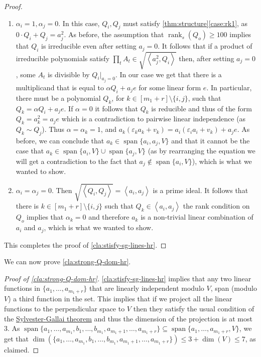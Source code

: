 \documentclass[10pt,a4paper]{article}
\def\rank{\operatorname{rank}}
\newcommand{\ideal}[1]{\left \langle{#1}\right \rangle}
\newcommand{\MVar}[2]{{#1}_1,\ldots, {#1}_{#2}}
\newcommand{\spn}[1]{\operatorname{span}\{{#1}\}}
\def\epsilon{\varepsilon}
\newcommand{\rkq}{100}
\begin{document}
\begin{proof}
\begin{enumerate}[label=(\roman*)]
	\item $\alpha_i= 1, \alpha_j = 0$. In this case, $Q_i,Q_j$ must satisfy \autoref{thm:structure}\ref{case:rk1}, as $0 \cdot Q_i + Q_j = a_j^2$. As before,  the  assumption that $\rank_s(Q_o)\geq \rkq$ implies that $Q_i$ is irreducible even after setting $a_j=0$. It follows that if a product of irreducible polynomials satisfy $\prod_t A_t \in  \sqrt{\ideal{a_j^2,Q_i}}$ then, after setting $a_j=0$, some $A_t$ is divisible by ${Q_i}|_{a_j=0}$. In our case we get that there is a multiplicand that is equal to $ \alpha Q_i + a_je$ for some linear form $e$. In particular, there must be a polynomial $Q_k$, for $k\in[m_1+r]\setminus \{i,j\}$, such that  $Q_k = \alpha Q_i + a_je$.
	If $\alpha = 0$ it follows that $Q_k$ is reducible and thus of the form $Q_k = a_k^2 = a_je$ which is a contradiction to pairwise linear independence (as $Q_k \sim Q_j$).  Thus $\alpha = \alpha_k = 1$, and $a_k(\epsilon_ka_k + v_k) = a_i(\epsilon_i a_i + v_k) + a_je$. As before, we can conclude that $a_k \in \spn{a_i,a_j,V}$ and that it cannot be the case that $a_k \in \spn{a_i,V} \cup \spn{a_j,V}$ (as by rearranging the equation we will get a contradiction to the fact that $a_j \notin \spn{a_i,V}$),  which is what we wanted to show.
	
	

	
	\item  $\alpha_i= \alpha_j = 0$. Then $\sqrt{\ideal{Q_i,Q_j}} = \ideal{a_i,a_j}$ is a prime ideal. It follows that there is $k \in [m_1+r] \setminus \{i,j\}$ such that $Q_k \in \ideal{a_i,a_j}$ the  rank condition on $Q_o$ implies that $\alpha_k = 0$ and therefore $a_k$ is a non-trivial linear combination of $a_i$ and $a_j$, which is what we wanted to show.
	
	
\end{enumerate}
 






This completes the proof of \autoref{cla:stisfy-sg-lines-hr}.
\end{proof}




We can now prove  \autoref{cla:strong-Q-dom-hr}.

\begin{proof}[Proof of  \autoref{cla:strong-Q-dom-hr}]








\autoref{cla:stisfy-sg-lines-hr} implies that any two linear functions in $\{\MVar{a}{m_1+r}\}$ that are linearly independent modulo $V$, span (modulo $V$) a third function in the set. This implies that if we project all the linear functions to the perpendicular space to $V$ then they satisfy the usual condition of the \hyperref[thm:SG-linforms]{Sylvester-Gallai theorem} and thus the dimension of the projection is at most $3$. As $\spn{ \MVar{a}{m_1}, \MVar{b}{m_1},a_{m_1+1},\ldots,a_{m_1+r}} \subseteq \spn{\MVar{a}{m_1+r},V}$, we get  that  $\dim(\{\MVar{a}{m_1}, \MVar{b}{m_1},a_{m_1+1},\ldots,a_{m_1+r}\}) \leq 3+\dim(V) \leq 7$, as claimed.
\end{proof}
\end{document}
